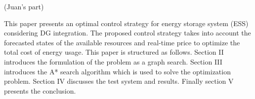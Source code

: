 (Juan's part)


This paper presents an optimal control strategy for energy storage system (ESS) considering DG integration. The proposed control strategy takes into account the forecasted states of the available resources and real-time price to optimize the total cost of energy usage. This paper is structured as follows. Section II introduces the formulation of the problem as a graph search. Section III introduces the A* search algorithm which is used to solve the optimization problem. Section IV discusses the test system and results. Finally section V presents the conclusion.

